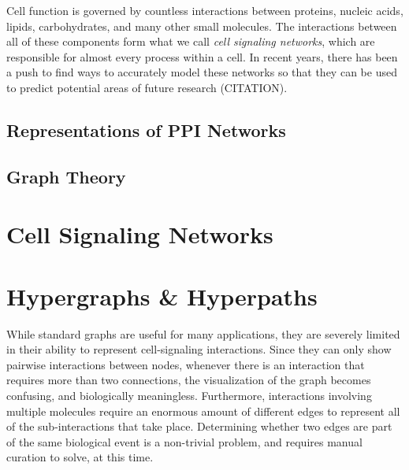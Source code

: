 \documentclass[12pt,twoside]{reedthesis}
\begin{document}
	
	Cell function is governed by countless interactions between proteins, nucleic acids, lipids, carbohydrates, and many other small molecules.  The interactions between all of these components form what we call \textit{cell signaling networks}, which are responsible for almost every process within a cell.  In recent years, there has been a push to find ways to accurately model these networks so that they can be used to predict potential areas of future research (CITATION).


\section{Representations of PPI Networks}


\section{Graph Theory}

    \chapter{Cell Signaling Networks}
    	
    \chapter{Hypergraphs \& Hyperpaths}
    
While standard graphs are useful for many applications, they are severely limited in their ability to represent cell-signaling interactions.  Since they can only show pairwise interactions between nodes, whenever there is an interaction that requires more than two connections, the visualization of the graph becomes confusing, and biologically meaningless.  Furthermore, interactions involving multiple molecules require an enormous amount of different edges to represent all of the sub-interactions that take place.  Determining whether two edges are part of the same biological event is a non-trivial problem, and requires manual curation to solve, at this time.
\end{document}
